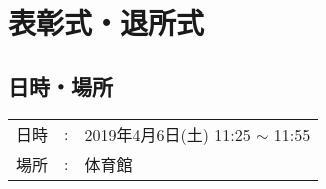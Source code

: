 %

\section{表彰式・退所式}

\subsection{日時・場所}
\begin{tabular}{p{}rp{}}
  日時 & : & 2019年4月6日(土) 11:25 $\sim$ 11:55\\
  場所 & : & 体育館
\end{tabular}

